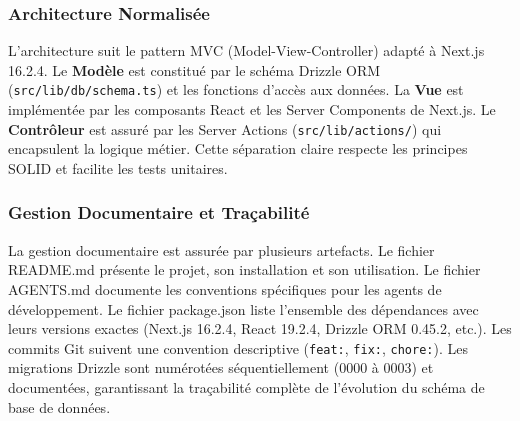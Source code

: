 \subsubsection{Architecture Normalisée}



L'architecture suit le pattern MVC (Model-View-Controller) adapté à Next.js 16.2.4. Le \textbf{Modèle} est constitué par le schéma Drizzle ORM (\texttt{src/lib/db/schema.ts}) et les fonctions d'accès aux données. La \textbf{Vue} est implémentée par les composants React et les Server Components de Next.js. Le \textbf{Contrôleur} est assuré par les Server Actions (\texttt{src/lib/actions/}) qui encapsulent la logique métier. Cette séparation claire respecte les principes SOLID et facilite les tests unitaires.



\subsubsection{Gestion Documentaire et Traçabilité}



La gestion documentaire est assurée par plusieurs artefacts. Le fichier README.md présente le projet, son installation et son utilisation. Le fichier AGENTS.md documente les conventions spécifiques pour les agents de développement. Le fichier package.json liste l'ensemble des dépendances avec leurs versions exactes (Next.js 16.2.4, React 19.2.4, Drizzle ORM 0.45.2, etc.). Les commits Git suivent une convention descriptive (\texttt{feat:}, \texttt{fix:}, \texttt{chore:}). Les migrations Drizzle sont numérotées séquentiellement (0000 à 0003) et documentées, garantissant la traçabilité complète de l'évolution du schéma de base de données.

